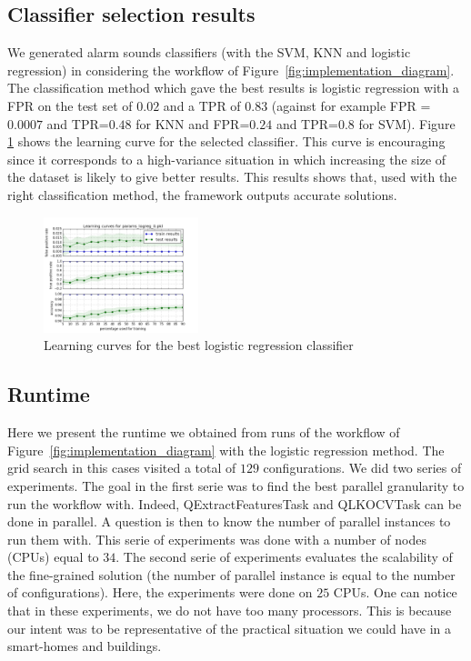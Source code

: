 \documentclass[10pt, conference, compsocconf]{IEEEtran}
\begin{document}
\subsection{Classifier selection results}
We generated alarm sounds classifiers (with the SVM, KNN and logistic regression) in considering the workflow of 
Figure~\ref{fig:implementation_diagram}. 
The classification method which gave the best results is logistic regression with a FPR on the test set of $0.02$ and a TPR of $0.83$ (against for example FPR = $0.0007$ and TPR=$0.48$ for KNN and FPR=$0.24$ and TPR=$0.8$ for SVM). Figure \ref{fig:learning_curve} shows the learning curve for the selected classifier. This curve is encouraging since it corresponds to a high-variance situation in which increasing the size of the dataset is likely to give better results. This results shows that, used with the right classification method, the framework outputs accurate solutions. 
\begin{figure}[h]
  \centering
  \includegraphics[width=0.4\textwidth]{Figures/learning_curve_logreg0_newdata.png}
  \caption{Learning curves for the best logistic regression classifier \label{fig:learning_curve}}
\end{figure}

\subsection{Runtime}
Here we present the runtime we obtained from runs of the workflow of Figure~\ref{fig:implementation_diagram} with the logistic 
regression method. The grid search in this cases visited a total of $129$ configurations. We did two series of experiments. 
The goal in the first serie was to find the best parallel granularity to run the workflow with. Indeed, 
QExtractFeaturesTask and QLKOCVTask can be done in parallel. A question is then to know the number of parallel instances to run them with.
This serie of experiments was done with a number of nodes (CPUs) equal to $34$. 
The second serie of experiments evaluates the scalability of the fine-grained solution (the number of parallel instance is equal to the 
number of configurations). Here, the experiments were done on $25$ CPUs.
One can notice that in these experiments, we do not have too many processors. This is because our intent was to be representative 
of the practical situation we could have in a smart-homes and buildings.   
\end{document}
